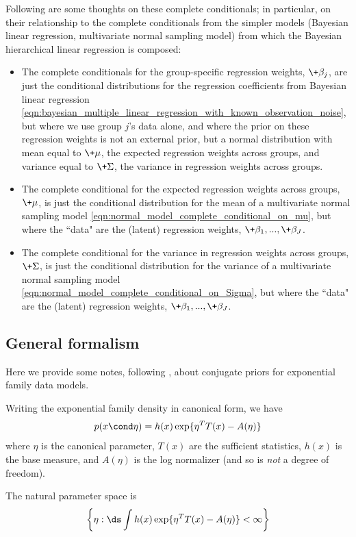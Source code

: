\documentclass{article} %
\begin{document}
Following are some thoughts on these complete conditionals; in particular,  on their relationship to the complete conditionals from the simpler models (Bayesian linear regression,  multivariate normal sampling model) from which the Bayesian hierarchical linear regression is composed:
\begin{itemize}
\item The complete conditionals for the group-specific regression weights,  $\+\beta_j$,  are just the conditional distributions for the regression coefficients from Bayesian linear regression \eqref{eqn:bayesian_multiple_linear_regression_with_known_observation_noise},  but where we use group $j$'s data alone,  and where the prior on these regression weights is not an external prior,  but a normal distribution with mean equal to $\+\mu$,  the expected regression weights across groups,  and variance equal to $\+\Sigma$,  the variance in regression weights across groups. 
\item The complete conditional  for the expected regression weights across groups,  $\+\mu$,   is just the conditional distribution for the mean of a multivariate normal sampling model \eqref{eqn:normal_model_complete_conditional_on_mu},  but where the ``data" are the (latent) regression weights,  $\+\beta_1, ...,\+\beta_J$. 
\item The complete conditional  for the variance in regression weights across groups,  $\+\Sigma$,   is just the conditional distribution for the variance of a multivariate normal sampling model \eqref{eqn:normal_model_complete_conditional_on_Sigma},  but where the ``data" are the (latent) regression weights, $\+\beta_1, ...,\+\beta_J$. 
\end{itemize}

\subsection{General formalism} \label{sec:ef_general_formalism}
Here we provide some notes, following \cite{jordan_ef}, about conjugate priors for exponential family data models. 

Writing the exponential family density in canonical form, we have
\[ p(x \cond \eta) = h(x) \exp \{ \eta^T T(x) - A(\eta) \} \]
where $\eta$ is the canonical parameter, $T(x)$ are the sufficient statistics,  $h(x)$ is the base measure, and $A(\eta)$ is the log normalizer (and so is \textit{not} a degree of freedom). 

The natural parameter space is 
\[  \bigg\{\eta : \ds\int h(x) \exp \{ \eta^T T(x) - A(\eta) \} < \infty \bigg \}\]
\end{document}
